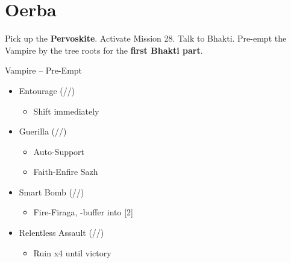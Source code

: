 \chapter{Oerba}

\renewcommand{\first}{[1] Guerilla (\syn/\rav/\sab)}
\renewcommand{\second}{[2] Relentless Assault (\com/\rav/\rav)}
\renewcommand{\third}{[3] Entourage (\rav/\sen/\med)}
\renewcommand{\fourth}{[4] Solidarity (\com/\sen/\med)}
\renewcommand{\fifth}{[5] Smart Bomb (\rav/\rav/\sab)}
\renewcommand{\sixth}{[6] Diversity (\com/\rav/\med)}

Pick up the \textbf{Pervoskite}.
Activate Mission 28.
Talk to Bhakti.
Pre-empt the Vampire by the tree roots for the \textbf{first Bhakti part}.

\begin{battle}{Vampire -- Pre-Empt}
	\begin{itemize}
		\item \third
			\begin{itemize}
				\item Shift immediately
			\end{itemize}
		\item \first
			\begin{itemize}
				\item Auto-Support
				\item Faith-Enfire Sazh
			\end{itemize}
		\item \fifth
			\begin{itemize}
				\item Fire-Firaga, \com-buffer into [2]
			\end{itemize}
		\item \second
			\begin{itemize}
				\item Ruin x4 until victory
			\end{itemize}
	\end{itemize}
\end{battle}
\vfill
